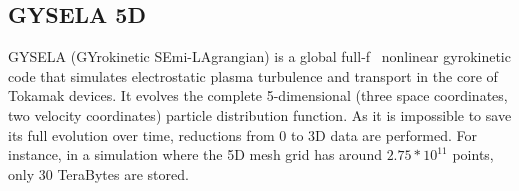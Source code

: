 \subsection{GYSELA 5D}
GYSELA (GYrokinetic SEmi-LAgrangian) is a global full-f~\cite{Garbet_2010} nonlinear gyrokinetic code that simulates electrostatic plasma turbulence and transport in the core of Tokamak devices. 
It evolves the complete 5-dimensional (three space coordinates, two velocity coordinates) particle distribution function. As it is impossible to save its full evolution over time, reductions from 0 to 3D data are performed.
For instance, in a simulation where the 5D mesh grid has around $2.75*10^{11}$ points, only 30 TeraBytes are stored.




